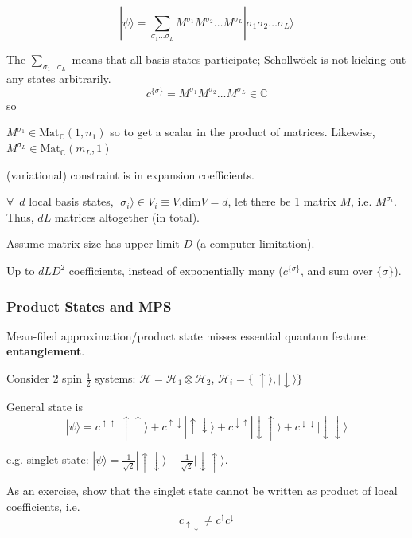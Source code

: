 \begin{equation}
| \psi \rangle = \sum_{\sigma_1 \dots \sigma_L} M^{\sigma_1} M^{\sigma_2} \dots M^{\sigma_L} | \sigma_1 \sigma_2 \dots \sigma_L \rangle
\end{equation}

The $\sum_{\sigma_1 \dots \sigma_L}$ means that all basis states participate; Schollw\"{o}ck is not kicking out any states arbitrarily. 
\[
c^{\lbrace \sigma \rbrace} = M^{\sigma_1} M^{\sigma_2} \dots M^{\sigma_L} \in \mathbb{C}
\] so

$M^{\sigma_1} \in \text{Mat}_{\mathbb{C}}(1, n_1)$ so to get a scalar in the product of matrices. Likewise, $M^{\sigma_L} \in \text{Mat}_{\mathbb{C}}(m_L, 1)$

(variational) constraint is in expansion coefficients. 

$\forall \, $ $d$ local basis states, $|\sigma_i \rangle \in V_i \equiv V$,$\text{dim}V = d$, let there be 1 matrix $M$, i.e. $M^{\sigma_i}$.  \\
Thus, $dL$ matrices altogether (in total).

Assume matrix size has upper limit $D$ (a computer limitation).

Up to $dLD^2$ coefficients, instead of exponentially many ($c^{\lbrace \sigma \rbrace}$, and sum over $\lbrace \sigma \rbrace$). 

\subsubsection{Product States and MPS}

Mean-filed approximation/product state misses essential quantum feature: \textbf{entanglement}. 

Consider 2 spin $\frac{1}{2}$ systems: $\mathcal{H} = \mathcal{H}_1 \otimes \mathcal{H}_2$, $\mathcal{H}_i = \lbrace | \uparrow \rangle, | \downarrow \rangle \rbrace$

General state is 
\[
| \psi \rangle = c^{ \uparrow \uparrow} | \uparrow \uparrow \rangle + c^{ \uparrow \downarrow} | \uparrow \downarrow \rangle + c^{ \downarrow \uparrow} | \downarrow \uparrow \rangle + c^{ \downarrow \downarrow} | \downarrow \downarrow \rangle 
\]

e.g. singlet state: $|\psi \rangle = \frac{1}{ \sqrt{2} } | \uparrow \downarrow \rangle - \frac{1}{ \sqrt{2} } | \downarrow \uparrow \rangle $. 

As an exercise, show that the singlet state cannot be written as product of local coefficients, i.e. 
\[
c_{\uparrow \downarrow } \neq c^{\uparrow} c^{ \downarrow }
\]

